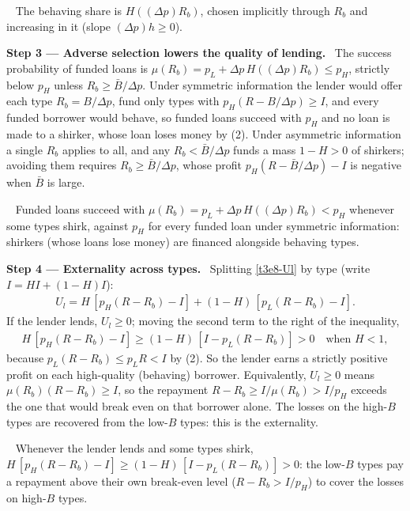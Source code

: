 \documentclass[11pt,a4paper]{article}
\newcommand{\step}[2]{\par\medskip\noindent\textbf{Step #1 --- #2.}~}
\newcommand{\answer}[1]{\par\smallskip\noindent\fbox{\textbf{Answer #1.}}~}
\begin{document}
\answer{(1)} The behaving share is $H((\Delta p)R_b)$, chosen implicitly through $R_b$ and increasing in it (slope $(\Delta p)h\ge0$).

\step{3}{Adverse selection lowers the quality of lending} The success probability of funded loans is $\mu(R_b)=p_L+\Delta p\,H((\Delta p)R_b)\le p_H$, strictly below $p_H$ unless $R_b\ge\bar B/\Delta p$. Under symmetric information the lender would offer each type $R_b=B/\Delta p$, fund only types with $p_H(R-B/\Delta p)\ge I$, and every funded borrower would behave, so funded loans succeed with $p_H$ and no loan is made to a shirker, whose loan loses money by (2). Under asymmetric information a single $R_b$ applies to all, and any $R_b<\bar B/\Delta p$ funds a mass $1-H>0$ of shirkers; avoiding them requires $R_b\ge\bar B/\Delta p$, whose profit $p_H(R-\bar B/\Delta p)-I$ is negative when $\bar B$ is large.

\answer{(2)} Funded loans succeed with $\mu(R_b)=p_L+\Delta p\,H((\Delta p)R_b)<p_H$ whenever some types shirk, against $p_H$ for every funded loan under symmetric information: shirkers (whose loans lose money) are financed alongside behaving types.

\step{4}{Externality across types} Splitting \eqref{t3e8-Ul} by type (write $I=HI+(1-H)I$):
\begin{align}
  U_l = H\,[p_H(R-R_b)-I] + (1-H)\,[p_L(R-R_b)-I]. \label{t3e8-split}
\end{align}
If the lender lends, $U_l\ge0$; moving the second term to the right of the inequality,
\begin{align}
  H\,[p_H(R-R_b)-I] \ge (1-H)\,[I-p_L(R-R_b)] > 0 \quad\text{when } H<1, \label{t3e8-ext}
\end{align}
because $p_L(R-R_b)\le p_LR<I$ by (2). So the lender earns a strictly positive profit on each high-quality (behaving) borrower. Equivalently, $U_l\ge0$ means $\mu(R_b)(R-R_b)\ge I$, so the repayment $R-R_b\ge I/\mu(R_b)>I/p_H$ exceeds the one that would break even on that borrower alone. The losses on the high-$B$ types are recovered from the low-$B$ types: this is the externality.

\answer{(3)} Whenever the lender lends and some types shirk, $H\,[p_H(R-R_b)-I]\ge(1-H)\,[I-p_L(R-R_b)]>0$: the low-$B$ types pay a repayment above their own break-even level ($R-R_b>I/p_H$) to cover the losses on high-$B$ types.
\end{document}
